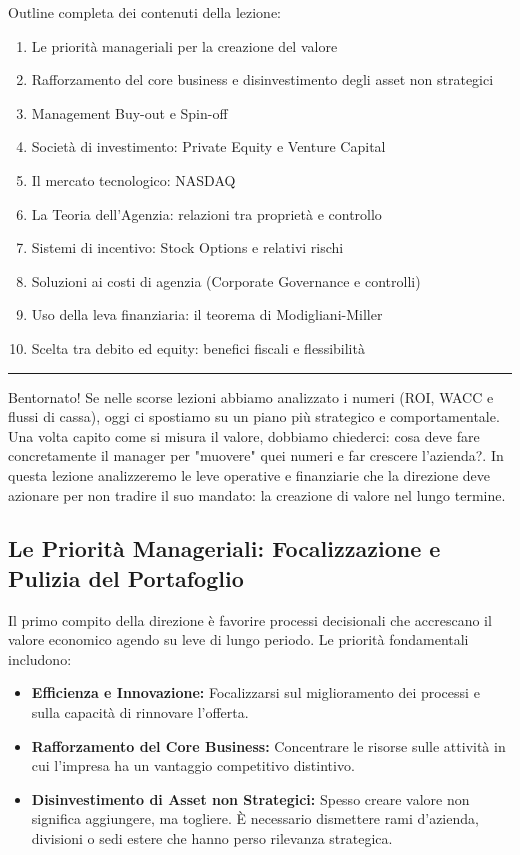 \documentclass[a4paper,10pt]{article}
\begin{document}
Outline completa dei contenuti della lezione:
{\small
\begin{enumerate}
\item Le priorità manageriali per la creazione del valore
\item Rafforzamento del core business e disinvestimento degli asset non strategici
\item Management Buy-out e Spin-off
\item Società di investimento: Private Equity e Venture Capital
\item Il mercato tecnologico: NASDAQ
\item La Teoria dell'Agenzia: relazioni tra proprietà e controllo
\item Sistemi di incentivo: Stock Options e relativi rischi
\item Soluzioni ai costi di agenzia (Corporate Governance e controlli)
\item Uso della leva finanziaria: il teorema di Modigliani-Miller
\item Scelta tra debito ed equity: benefici fiscali e flessibilità
\end{enumerate}
}
\hrule
\vspace{0.5cm}

Bentornato! Se nelle scorse lezioni abbiamo analizzato i numeri (ROI, WACC e flussi di cassa), oggi ci spostiamo su un piano più strategico e comportamentale. Una volta capito come si misura il valore, dobbiamo chiederci: cosa deve fare concretamente il manager per "muovere" quei numeri e far crescere l'azienda?. In questa lezione analizzeremo le leve operative e finanziarie che la direzione deve azionare per non tradire il suo mandato: la creazione di valore nel lungo termine.

\subsection*{Le Priorità Manageriali: Focalizzazione e Pulizia del Portafoglio}

Il primo compito della direzione è favorire processi decisionali che accrescano il valore economico agendo su leve di lungo periodo. Le priorità fondamentali includono:
\begin{itemize}
    \item \textbf{Efficienza e Innovazione:} Focalizzarsi sul miglioramento dei processi e sulla capacità di rinnovare l'offerta.
    \item \textbf{Rafforzamento del Core Business:} Concentrare le risorse sulle attività in cui l'impresa ha un vantaggio competitivo distintivo.
    \item \textbf{Disinvestimento di Asset non Strategici:} Spesso creare valore non significa aggiungere, ma togliere. È necessario dismettere rami d'azienda, divisioni o sedi estere che hanno perso rilevanza strategica.
\end{itemize}
\end{document}
